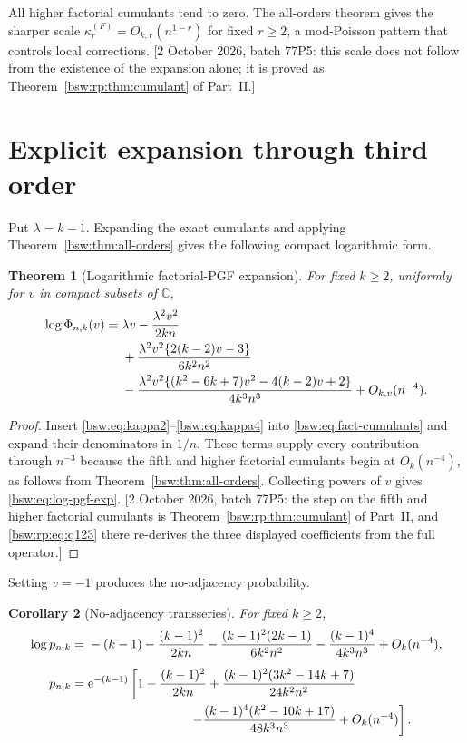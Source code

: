\documentclass[11pt,letterpaper]{article}
\newtheorem{theorem}{Theorem}[section]
\newtheorem{corollary}[theorem]{Corollary}
\theoremstyle{definition}
\theoremstyle{remark}
\newcommand{\CC}{\mathbb C}
\newcommand{\ee}{\mathrm e}
\begin{document}
All higher factorial cumulants tend to zero.  The all-orders theorem gives the
sharper scale $\kappa_r^{(F)}=O_{k,r}(n^{1-r})$ for fixed $r\ge2$, a
mod-Poisson pattern that controls local corrections.
[2 October 2026, batch 77P5: this scale does not follow from the existence
of the expansion alone; it is proved as Theorem~\ref{bsw:rp:thm:cumulant}
of Part~II.]

\section{Explicit expansion through third order}

Put $\lambda=k-1$.  Expanding the exact cumulants and applying
Theorem~\ref{bsw:thm:all-orders} gives the following compact logarithmic form.

\begin{theorem}[Logarithmic factorial-PGF expansion]\label{bsw:thm:log-pgf}
For fixed $k\ge2$, uniformly for $v$ in compact subsets of $\CC$,
\begin{align}
 \log\Phi_{n,k}(v)
={}&\lambda v
-\frac{\lambda^2v^2}{2kn}\notag\\
&+\frac{\lambda^2v^2\{2(k-2)v-3\}}{6k^2n^2}\notag\\
&-\frac{\lambda^2v^2
 \{(k^2-6k+7)v^2-4(k-2)v+2\}}
 {4k^3n^3}
+O_{k,v}(n^{-4}).
\label{bsw:eq:log-pgf-exp}
\end{align}
\end{theorem}

\begin{proof}
Insert \eqref{bsw:eq:kappa2}--\eqref{bsw:eq:kappa4} into
\eqref{bsw:eq:fact-cumulants} and expand their denominators in $1/n$.  These terms
supply every contribution through $n^{-3}$ because the fifth and higher
factorial cumulants begin at $O_k(n^{-4})$, as follows from
Theorem~\ref{bsw:thm:all-orders}.  Collecting powers of $v$ gives
\eqref{bsw:eq:log-pgf-exp}.
[2 October 2026, batch 77P5: the step on the fifth and higher factorial
cumulants is Theorem~\ref{bsw:rp:thm:cumulant} of Part~II, and
\eqref{bsw:rp:eq:q123} there re-derives the three displayed coefficients
from the full operator.]
\end{proof}

Setting $v=-1$ produces the no-adjacency probability.

\begin{corollary}[No-adjacency transseries]\label{bsw:cor:p-expansion}
For fixed $k\ge2$,
\begin{align}
 \log p_{n,k}
={}&-(k-1)
-\frac{(k-1)^2}{2kn}
-\frac{(k-1)^2(2k-1)}{6k^2n^2}
-\frac{(k-1)^4}{4k^3n^3}
+O_k(n^{-4}),
\label{bsw:eq:logp}\\[0.5em]
 p_{n,k}
={}&\ee^{-(k-1)}\left[
 1-\frac{(k-1)^2}{2kn}
 +\frac{(k-1)^2(3k^2-14k+7)}{24k^2n^2}\right.\notag\\
&\hspace{8em}\left.
 -\frac{(k-1)^4(k^2-10k+17)}{48k^3n^3}
 +O_k(n^{-4})\right].
\label{bsw:eq:pfull}
\end{align}
\end{corollary}
\end{document}
